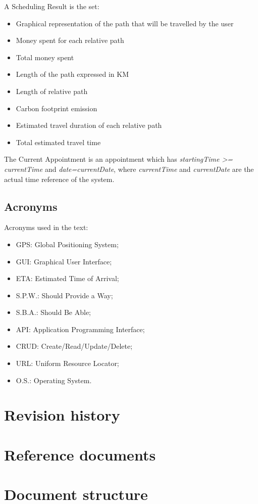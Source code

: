 \begin{definition} \label{def:schedulingResult}
A Scheduling Result is the set:
\begin{itemize}
\item Graphical representation of the path that will be travelled by the user
\item Money spent for each relative path
\item Total money spent 
\item Length of the path expressed in KM
\item Length of relative path 
\item Carbon footprint emission
\item Estimated travel duration of each relative path
\item Total estimated travel time
\end{itemize}
\end{definition}

\begin{definition} \label{def:currentAppointment}
The Current Appointment is an appointment which has \textit{startingTime >= currentTime } and \textit{date=currentDate}, where \textit{currentTime} and  \textit{currentDate} are the actual time reference of the system.
\end{definition}


\subsection{Acronyms}
Acronyms used in the text:
\begin{itemize}
\item GPS: Global Positioning System;
\item GUI: Graphical User Interface;
\item ETA: Estimated Time of Arrival;
\item S.P.W.: Should Provide a Way;
\item S.B.A.: Should Be Able;
\item API: Application Programming Interface;
\item CRUD: Create/Read/Update/Delete;
\item URL: Uniform Resource Locator;
\item O.S.: Operating System.
\end{itemize}


\section{Revision history}

\section{Reference documents}

\section{Document structure}

 

